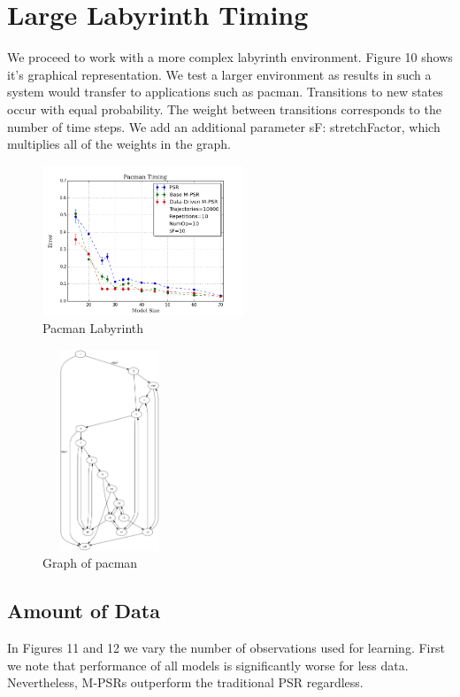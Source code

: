 \section{Large Labyrinth Timing}

We proceed to work with a more complex labyrinth environment. Figure 10 shows it's graphical representation. We test a larger environment as results in such a system would transfer to applications such as pacman. Transitions to new states occur with equal probability. The weight between transitions corresponds to the number of time steps. We add an additional parameter sF: stretchFactor, which multiplies all of the weights in the graph. 

\begin{figure}[ht!]
\centering
\includegraphics[width=60mm]{uCOREPICS/Pacman/Pacman10k.png}
\caption{Pacman Labyrinth\label{overflow}}
\end{figure}

\begin{figure}[ht!]
\centering
\includegraphics[width=40mm,height=60mm]{uCOREPICS/Pacman/graphPacMan.png}
\caption{Graph of pacman\label{overflow}}
\end{figure}

\subsection{Amount of Data}

In Figures 11 and 12 we vary the number of observations used for learning. First we note that performance of all models is significantly worse for less data. Nevertheless, M-PSRs outperform the traditional PSR regardless.

